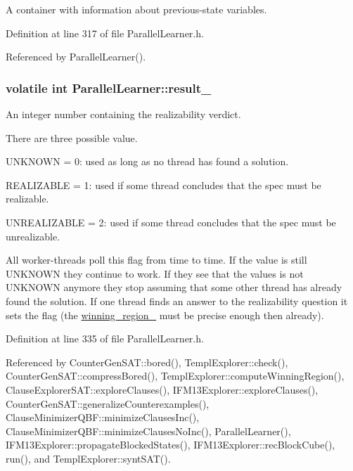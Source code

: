 A container with information about previous-\/state variables. 



Definition at line 317 of file Parallel\-Learner.\-h.



Referenced by Parallel\-Learner().

\hypertarget{classParallelLearner_aa44682a4999526a304b5118047df7a44}{
\subsubsection[{result\-\_\-}]{\setlength{\rightskip}{0pt plus 5cm}volatile int Parallel\-Learner\-::result\-\_\-}}\label{classParallelLearner_aa44682a4999526a304b5118047df7a44}


An integer number containing the realizability verdict. 

There are three possible value. 
\begin{DoxyItemize}
\item U\-N\-K\-N\-O\-W\-N = 0\-: used as long as no thread has found a solution. 
\item R\-E\-A\-L\-I\-Z\-A\-B\-L\-E = 1\-: used if some thread concludes that the spec must be realizable. 
\item U\-N\-R\-E\-A\-L\-I\-Z\-A\-B\-L\-E = 2\-: used if some thread concludes that the spec must be unrealizable. 
\end{DoxyItemize}All worker-\/threads poll this flag from time to time. If the value is still U\-N\-K\-N\-O\-W\-N they continue to work. If they see that the values is not U\-N\-K\-N\-O\-W\-N anymore they stop assuming that some other thread has already found the solution. If one thread finds an answer to the realizability question it sets the flag (the \hyperlink{classParallelLearner_a7c8383543ff98d7a0356a237756dcdd6}{winning\-\_\-region\-\_\-} must be precise enough then already). 

Definition at line 335 of file Parallel\-Learner.\-h.



Referenced by Counter\-Gen\-S\-A\-T\-::bored(), Templ\-Explorer\-::check(), Counter\-Gen\-S\-A\-T\-::compress\-Bored(), Templ\-Explorer\-::compute\-Winning\-Region(), Clause\-Explorer\-S\-A\-T\-::explore\-Clauses(), I\-F\-M13\-Explorer\-::explore\-Clauses(), Counter\-Gen\-S\-A\-T\-::generalize\-Counterexamples(), Clause\-Minimizer\-Q\-B\-F\-::minimize\-Clauses\-Inc(), Clause\-Minimizer\-Q\-B\-F\-::minimize\-Clauses\-No\-Inc(), Parallel\-Learner(), I\-F\-M13\-Explorer\-::propagate\-Blocked\-States(), I\-F\-M13\-Explorer\-::rec\-Block\-Cube(), run(), and Templ\-Explorer\-::synt\-S\-A\-T().


